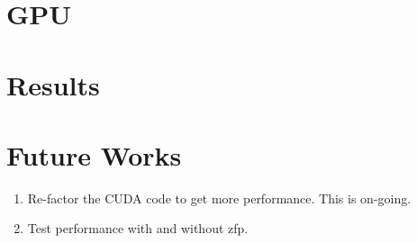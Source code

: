 \documentclass[journal]{vgtc}                %
\begin{document}
\section{GPU}

\section{Results}
\section{Future Works}

\begin{enumerate}
\item Re-factor the CUDA code to get more performance. This is on-going.
\item Test performance with and without zfp.
\end{enumerate}




\end{document}
